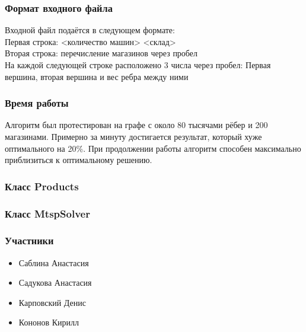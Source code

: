 \documentclass{beamer}
\begin{document}
\begin{frame}
    \frametitle{Формат входного файла}
    Входной файл подаётся в следующем формате:\\
    Первая строка: <количество машин> <склад>\\
    Вторая строка: перечисление магазинов через пробел\\
    На каждой следующей строке расположено 3 числа через пробел:
    Первая вершина, вторая вершина и вес ребра между ними
\end{frame}
\begin{frame}
    \frametitle{Время работы}
    Алгоритм был протестирован на графе с около 80 тысячами рёбер и 200 магазинами.
    Примерно за минуту достигается результат, который хуже оптимального на 20\%.
    При продолжении работы алгоритм способен максимально приблизиться к оптимальному решению.
\end{frame}
\begin{frame}[fragile]
\frametitle{Класс Products}

\end{frame}
\begin{frame}[fragile]
\frametitle{Класс MtspSolver}

\end{frame}
\begin{frame}[fragile]

\end{frame}
\begin{frame}
\frametitle{Участники}
\begin{itemize}
    \item Саблина Анастасия
    \item Садукова Анастасия
    \item Карповский Денис
    \item Кононов Кирилл
\end{itemize}
\end{frame}
\end{document}
